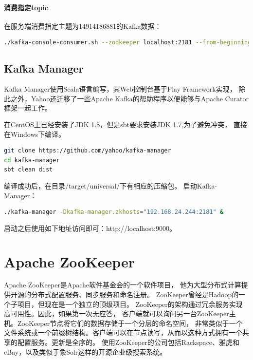 \documentclass{book}
\begin{document}
\paragraph{消费指定topic}

在服务端消费指定主题为14914186881的Kafka数据：

\begin{lstlisting}[language=Bash]
./kafka-console-consumer.sh --zookeeper localhost:2181 --from-beginning --topic 14914186881
\end{lstlisting}

\subsection{Kafka Manager}

Kafka Manager使用Scala语言编写，其Web控制台基于Play Framework实现，
除此之外，Yahoo还迁移了一些Apache Kafka的帮助程序以便能够与Apache Curator框架一起工作。

在CentOS上已经安装了JDK 1.8，但是sbt要求安装JDK 1.7,为了避免冲突，
直接在Windows下编译。

\begin{lstlisting}[language=Bash]
git clone https://github.com/yahoo/kafka-manager
cd kafka-manager
sbt clean dist
\end{lstlisting}

编译成功后，在目录/target/universal/下有相应的压缩包。
启动Kafka-Manager：

\begin{lstlisting}[language=Bash]
./kafka-manager -Dkafka-manager.zkhosts="192.168.24.244:2181" &
\end{lstlisting}

启动之后使用如下地址访问即可：http://localhost:9000。

\section{Apache ZooKeeper}

Apache ZooKeeper是Apache软件基金会的一个软件项目，
他为大型分布式计算提供开源的分布式配置服务、同步服务和命名注册。
ZooKeeper曾经是Hadoop的一个子项目，但现在是一个独立的顶级项目。
ZooKeeper的架构通过冗余服务实现高可用性。因此，如果第一次无应答，
客户端就可以询问另一台ZooKeeper主机。ZooKeeper节点将它们的数据存储于一个分层的命名空间，
非常类似于一个文件系统或一个前缀树结构。客户端可以在节点读写，从而以这种方式拥有一个共享的配置服务。更新是全序的。
使用ZooKeeper的公司包括Rackspace、雅虎和eBay，以及类似于象Solr这样的开源企业级搜索系统。
\end{document}
